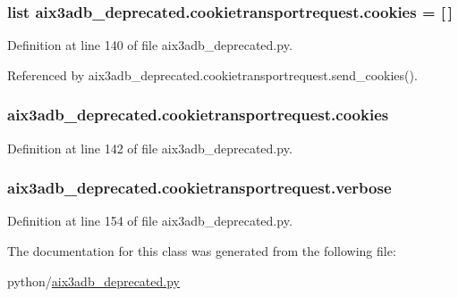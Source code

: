 \subsubsection[{cookies}]{\setlength{\rightskip}{0pt plus 5cm}list aix3adb\-\_\-deprecated.\-cookietransportrequest.\-cookies = \mbox{[}$\,$\mbox{]}\hspace{0.3cm}{\ttfamily [static]}}\label{classaix3adb__deprecated_1_1cookietransportrequest_af3590dbaf2529939c8ee22788c807806}


Definition at line 140 of file aix3adb\-\_\-deprecated.\-py.



Referenced by aix3adb\-\_\-deprecated.\-cookietransportrequest.\-send\-\_\-cookies().

\subsubsection[{cookies}]{\setlength{\rightskip}{0pt plus 5cm}aix3adb\-\_\-deprecated.\-cookietransportrequest.\-cookies}\label{classaix3adb__deprecated_1_1cookietransportrequest_ae36266a6aa31661800c755fe26803b03}


Definition at line 142 of file aix3adb\-\_\-deprecated.\-py.

\subsubsection[{verbose}]{\setlength{\rightskip}{0pt plus 5cm}aix3adb\-\_\-deprecated.\-cookietransportrequest.\-verbose}\label{classaix3adb__deprecated_1_1cookietransportrequest_a21e8556ecdb0c551303044fe0584f296}


Definition at line 154 of file aix3adb\-\_\-deprecated.\-py.



The documentation for this class was generated from the following file\-:\begin{DoxyCompactItemize}
\item 
python/\hyperlink{aix3adb__deprecated_8py}{aix3adb\-\_\-deprecated.\-py}\end{DoxyCompactItemize}
